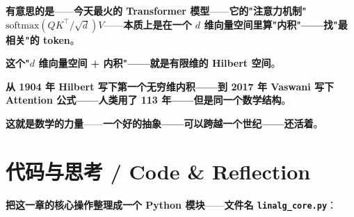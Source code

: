 \textbf{有意思的是}——\textbf{今天最火的 Transformer 模型}——\textbf{它的"注意力机制"$\mathrm{softmax}(QK^\top/\sqrt{d})V$}——\textbf{本质上是在一个 $d$ 维向量空间里算"内积"——找"最相关"的 token}。

\textbf{这个"$d$ 维向量空间 + 内积"——就是有限维的 Hilbert 空间}。

\textbf{从 1904 年 Hilbert 写下第一个无穷维内积——到 2017 年 Vaswani 写下 Attention 公式——人类用了 113 年——但是同一个数学结构}。

\textbf{这就是数学的力量}——\textbf{一个好的抽象——可以跨越一个世纪——还活着}。

\section{代码与思考 / Code \& Reflection}

\textbf{把这一章的核心操作整理成一个 Python 模块}——\textbf{文件名 \texttt{linalg\_core.py}}：

